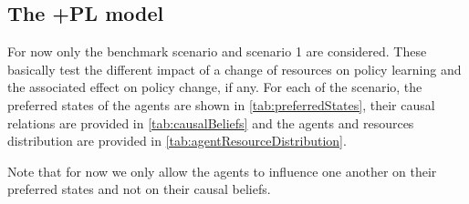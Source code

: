 \documentclass[12pt]{article}
\begin{document}
\subsection{The +PL model}

For now only the benchmark scenario and scenario 1 are considered. These basically test the different impact of a change of resources on policy learning and the associated effect on policy change, if any. For each of the scenario, the preferred states of the agents are shown in \autoref{tab:preferredStates}, their causal relations are provided in \autoref{tab:causalBeliefs} and the agents and resources distribution are provided in \autoref{tab:agentResourceDistribution}.

Note that for now we only allow the agents to influence one another on their preferred states and not on their causal beliefs.
\end{document}
